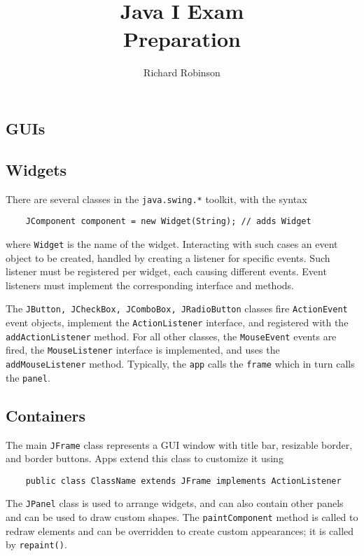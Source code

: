 \documentclass[letterpaper, openany, justified]{tufte-book}
\title{\\Java I Exam \\Preparation}
\author{Richard Robinson}
\newcommand{\cd}[1]{\lstinline{#1}}
\begin{document}
\maketitle
\setlength{\parindent}{0pt}
\begin{fullwidth}

\chapter{GUIs}

\section{Widgets}
There are several classes in the \lstinline{java.swing.*} toolkit, with the syntax \begin{lstlisting}
    JComponent component = new Widget(String); // adds Widget
\end{lstlisting}
where \lstinline{Widget} is the name of the widget. Interacting with such cases an event object to be created, handled by creating a listener for specific events. Such listener must be registered per widget, each causing different events. Event listeners must implement the corresponding interface and methods.

\bigskip
The \lstinline{JButton, JCheckBox, JComboBox, JRadioButton} classes fire \lstinline{ActionEvent} event objects, implement the \lstinline{ActionListener} interface, and registered with the \lstinline{addActionListener} method. For all other classes, the \lstinline{MouseEvent} events are fired, the \lstinline{MouseListener} interface is implemented, and uses the \lstinline{addMouseListener} method. Typically, the \lstinline{app} calls the \cd{frame} which in turn calls the \cd{panel}.

\section{Containers}
The main \lstinline{JFrame} class represents a GUI window with title bar, resizable border, and border buttons. Apps extend this class to customize  it using \begin{lstlisting}
    public class ClassName extends JFrame implements ActionListener
\end{lstlisting}
The \cd{JPanel} class is used to arrange widgets, and can also contain other panels and can be used to draw custom shapes. The \cd{paintComponent} method is called to redraw elements and can be overridden to create custom appearances; it is called by \cd{repaint()}.


\end{fullwidth}
\end{document}
